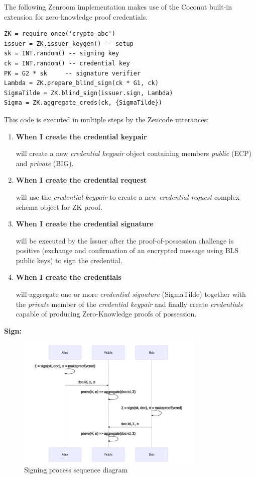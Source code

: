 \documentclass{article}
\begin{document}
The following Zenroom implementation makes use of the Coconut
built-in extension for zero-knowledge proof credentials.

\begin{lstlisting}[style=lua]
ZK = require_once('crypto_abc')
issuer = ZK.issuer_keygen() -- setup
sk = INT.random() -- signing key
ck = INT.random() -- credential key
PK = G2 * sk     -- signature verifier
Lambda = ZK.prepare_blind_sign(ck * G1, ck)
SigmaTilde = ZK.blind_sign(issuer.sign, Lambda)
Sigma = ZK.aggregate_creds(ck, {SigmaTilde})
\end{lstlisting}

This code is executed in multiple steps by the Zencode utterances:

\begin{enumerate}

\item \textbf{When I create the credential keypair}

  will create a new \emph{credential keypair} object containing
  members \emph{public} (ECP) and \emph{private} (BIG).

\item \textbf{When I create the credential request}

  will use the \emph{credential keypair} to create a new
  \emph{credential request} complex schema object for ZK proof.

\item \textbf{When I create the credential signature}

  will be executed by the Issuer after the proof-of-possession
  challenge is positive (exchange and confirmation of an encrypted
  message using BLS public keys) to sign the credential.

\item \textbf{When I create the credentials}

  will aggregate one or more \emph{credential signature} (SigmaTilde)
  together with the \emph{private} member of the \emph{credential
    keypair} and finally create \emph{credentials} capable of
  producing Zero-Knowledge proofs of possession.

\end{enumerate}



\textbf{Sign:}

\begin{figure}
  \caption{Signing process sequence diagram}
  \centering
  \includegraphics[width=0.8\textwidth]{sign-seq}
\end{figure}
\end{document}
